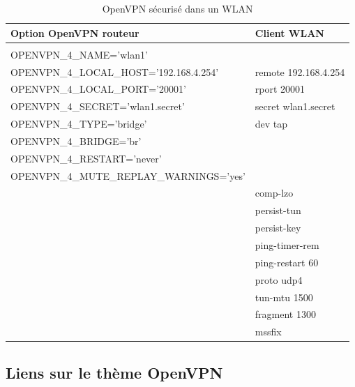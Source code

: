 \begin{table}[htbp]
  \begin{scriptsize}
    \begin{tabular}{ll}
      Option OpenVPN routeur                        & Client WLAN\\
      \hline \\
      OPENVPN\_4\_NAME='wlan1'                      & ~ \\
      OPENVPN\_4\_LOCAL\_HOST='192.168.4.254'       & remote 192.168.4.254\\
      OPENVPN\_4\_LOCAL\_PORT='20001'               & rport 20001 \\
      OPENVPN\_4\_SECRET='wlan1.secret'             & secret wlan1.secret \\
      OPENVPN\_4\_TYPE='bridge'                     & dev tap\\
      OPENVPN\_4\_BRIDGE='br'                       & ~\\
      OPENVPN\_4\_RESTART='never'                   & ~\\
      OPENVPN\_4\_MUTE\_REPLAY\_WARNINGS='yes'      & ~\\
      ~                                             & comp-lzo \\
      ~                                             & persist-tun \\
      ~                                             & persist-key \\
      ~                                             & ping-timer-rem \\
      ~                                             & ping-restart 60 \\
      ~                                             & proto udp4 \\
      ~                                             & tun-mtu 1500 \\
      ~                                             & fragment 1300 \\
      ~                                             & mssfix \\
    \end{tabular}
  \end{scriptsize}
  \caption{OpenVPN sécurisé dans un WLAN}
\end{table}


\subsection{Liens sur le thème OpenVPN}

